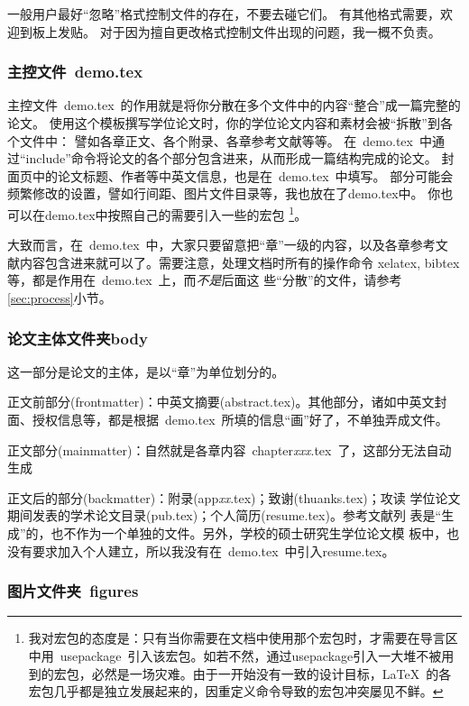 一般用户最好``忽略''格式控制文件的存在，不要去碰它们。
有其他格式需要，欢迎到板上发贴。
对于因为擅自更改格式控制文件出现的问题，我一概不负责。{\large\smiley}

\subsubsection{主控文件~demo.tex}
\label{sec:demotex}

主控文件~demo.tex~的作用就是将你分散在多个文件中的内容``整合''成一篇完整的论文。
使用这个模板撰写学位论文时，你的学位论文内容和素材会被``拆散''到各个文件中：
譬如各章正文、各个附录、各章参考文献等等。
在~demo.tex~中通过``include''命令将论文的各个部分包含进来，从而形成一篇结构完成的论文。
封面页中的论文标题、作者等中英文信息，也是在~demo.tex~中填写。
部分可能会频繁修改的设置，譬如行间距、图片文件目录等，我也放在了demo.tex中。
你也可以在demo.tex中按照自己的需要引入一些的宏包
\footnote{我对宏包的态度是：只有当你需要在文档中使用那个宏包时，才需要在导言区中用~usepackage~引入该宏包。如若不然，通过usepackage引入一大堆不被用到的宏包，必然是一场灾难。由于一开始没有一致的设计目标，\LaTeX~的各宏包几乎都是独立发展起来的，因重定义命令导致的宏包冲突屡见不鲜。}。

大致而言，在~demo.tex~中，大家只要留意把``章''一级的内容，以及各章参考文
献内容包含进来就可以了。需要注意，处理文档时所有的操作命令
{}\cndash{}xelatex, bibtex等，都是作用在~demo.tex~上，而\emph{不是}后面这
些``分散''的文件，请参考\ref{sec:process}小节。

\subsubsection{论文主体文件夹body}
\label{sec:thesisbody}

这一部分是论文的主体，是以``章''为单位划分的。

正文前部分(frontmatter)：中英文摘要(abstract.tex)。其他部分，诸如中英文封
面、授权信息等，都是根据~demo.tex~所填的信息``画''好了，不单独弄成文件。

正文部分(mainmatter)：自然就是各章内容~chapter\emph{xxx}.tex~了，这部分无法自动生成{\LARGE\Smiley}

正文后的部分(backmatter)：附录(app\emph{xx}.tex)；致谢(thuanks.tex)；攻读
学位论文期间发表的学术论文目录(pub.tex)；个人简历(resume.tex)。参考文献列
表是``生成''的，也不作为一个单独的文件。另外，学校的硕士研究生学位论文模
板中，也没有要求加入个人建立，所以我没有在~demo.tex~中引入resume.tex。

\subsubsection{图片文件夹~figures}
\label{sec:figuresdir}


